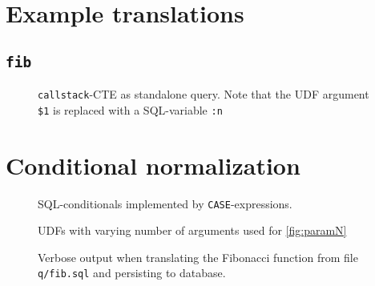 \section{Example translations}

\subsection{\texttt{fib}}
\begin{figure}[h!]
    \centering\footnotesize
    \caption{\texttt{callstack}-CTE as standalone query. Note that the UDF argument \texttt{\$1} is replaced with a SQL-variable \texttt{:n}}
    \label{fib:callstack_cte_complete}
\end{figure}

\section{Conditional normalization}
\begin{figure}[h!]
    \centering
{}\label{sql:conditionals}
    \caption{SQL-conditionals implemented by \texttt{CASE}-expressions.}
    \label{conditional_normalization}
\end{figure}

\begin{figure}[h!]
    \centering
    \caption{UDFs with varying number of arguments used for \autoref{fig:paramN}}
    \label{udfs:paramN}
\end{figure}

\begin{figure}[h!]
    \centering
    
    \caption{Verbose output when translating the Fibonacci function from file \texttt{q/fib.sql} and persisting to database.}
\end{figure}
